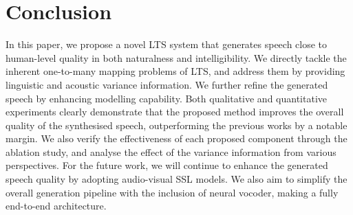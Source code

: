 \documentclass[letterpaper]{article} %
\begin{document}
\begin{table}
\centering
{}
\vspace{-1mm}
\caption{CMOS, WER, and CER results of an ablation study.}
\vspace{-2mm}
\label{table:ablation}
\end{table}


\section{Conclusion}

In this paper, we propose a novel LTS system that generates speech close to human-level quality in both naturalness and intelligibility. 
We directly tackle the inherent one-to-many mapping problems of LTS, and address them by providing linguistic and acoustic variance information.
We further refine the generated speech by enhancing modelling capability.
Both qualitative and quantitative experiments clearly demonstrate that the proposed method improves the overall quality of the synthesised speech, outperforming the previous works by a notable margin.
We also verify the effectiveness of each proposed component through the ablation study, and analyse the effect of the variance information from various perspectives.
For the future work, we will continue to enhance the generated speech quality by adopting audio-visual SSL models.
We also aim to simplify the overall generation pipeline with the inclusion of neural vocoder, making a fully end-to-end architecture. 

\clearpage
\end{document}
